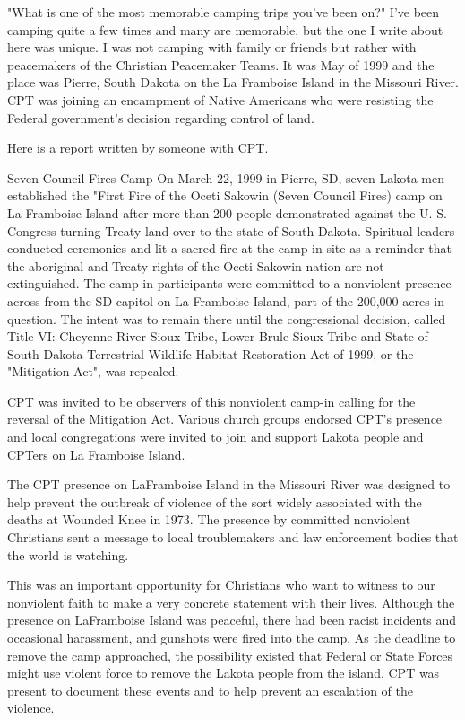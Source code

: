 "What is one of the most memorable camping trips you've been on?"
I've been camping quite a few times and many are memorable, but the one I write about here was unique.
I was not camping with family or friends but rather with peacemakers of the Christian Peacemaker Teams.
It was May of 1999 and the place was Pierre, South Dakota on the La Framboise Island in the Missouri River.
CPT was joining an encampment of Native Americans who were resisting the Federal government's decision regarding control of land.

Here is a report written by someone with CPT.

Seven Council Fires Camp
On March 22, 1999 in Pierre, SD, seven Lakota men established the "First Fire of the Oceti Sakowin (Seven Council Fires) camp on La Framboise Island after more than 200 people demonstrated against the U.
S.
Congress turning Treaty land over to the state of South Dakota.
Spiritual leaders conducted ceremonies and lit a sacred fire at the camp-in site as a reminder that the aboriginal and Treaty rights of the Oceti Sakowin nation are not extinguished.
The camp-in participants were committed to a nonviolent presence across from the SD capitol on La Framboise Island, part of the 200,000 acres in question.
The intent was to remain there until the congressional decision, called Title VI: Cheyenne River Sioux Tribe, Lower Brule Sioux Tribe and State of South Dakota Terrestrial Wildlife Habitat Restoration Act of 1999, or the "Mitigation Act", was repealed.

CPT was invited to be observers of this nonviolent camp-in calling for the reversal of the Mitigation Act.
Various church groups endorsed CPT's presence and local congregations were invited to join and support Lakota people and CPTers on La Framboise Island.

The CPT presence on LaFramboise Island in the Missouri River was designed to help prevent the outbreak of violence of the sort widely associated with the deaths at Wounded Knee in 1973.
The presence by committed nonviolent Christians sent a message to local troublemakers and law enforcement bodies that the world is watching.


This was an important opportunity for Christians who want to witness to our nonviolent faith to make a very concrete statement with their lives.
Although the presence on LaFramboise Island was peaceful, there had been racist incidents and occasional harassment, and gunshots were fired into the camp.
As the deadline to remove the camp approached, the possibility existed that Federal or State Forces might use violent force to remove the Lakota people from the island.
CPT was present to document these events and to help prevent an escalation of the violence.

